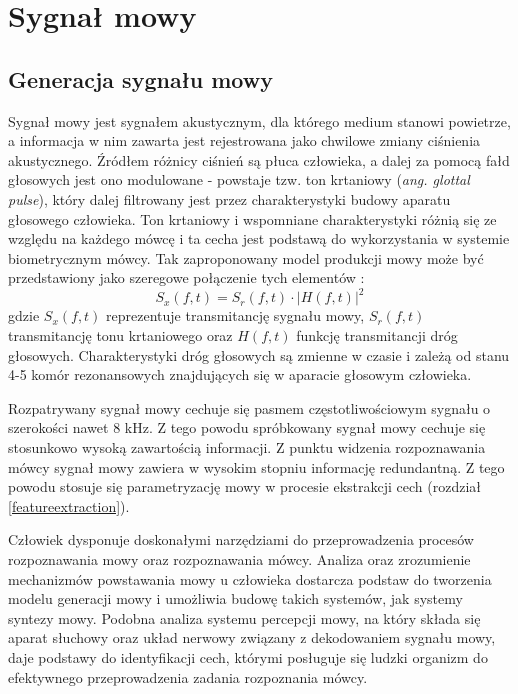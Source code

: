 \section{Sygnał mowy}

\subsection{Generacja sygnału mowy}
\label{glottal}
Sygnał mowy jest sygnałem akustycznym, dla którego medium stanowi powietrze, a informacja w nim zawarta jest rejestrowana jako chwilowe zmiany ciśnienia akustycznego. Źródłem różnicy ciśnień są płuca człowieka, a dalej za pomocą fałd głosowych jest ono modulowane - powstaje tzw. ton krtaniowy (\textit{ang. glottal pulse}), który dalej filtrowany jest przez charakterystyki budowy aparatu głosowego człowieka. Ton krtaniowy i wspomniane charakterystyki różnią się ze względu na każdego mówcę i ta
cecha jest podstawą do wykorzystania w systemie biometrycznym mówcy. Tak zaproponowany model produkcji mowy może być przedstawiony jako szeregowe połączenie tych elementów \cite{multidsp}:
\begin{equation}
  S_x(f,t) = S_r(f,t) \cdot |H(f,t)|^2
\end{equation}
gdzie $S_x(f,t)$ reprezentuje transmitancję sygnału mowy, $S_r(f,t)$ transmitancję tonu krtaniowego oraz $H(f,t)$ funkcję transmitancji dróg głosowych. Charakterystyki dróg głosowych są zmienne w czasie i zależą od stanu 4-5 komór rezonansowych znajdujących się w aparacie głosowym człowieka.

Rozpatrywany sygnał mowy cechuje się pasmem częstotliwościowym sygnału o szerokości nawet 8 kHz. Z tego powodu spróbkowany sygnał mowy cechuje się stosunkowo wysoką zawartością informacji. Z punktu widzenia rozpoznawania mówcy sygnał mowy zawiera w wysokim stopniu informację redundantną. Z tego powodu stosuje się parametryzację mowy w procesie ekstrakcji cech (rozdział \ref{featureextraction}).

Człowiek dysponuje doskonałymi narzędziami do przeprowadzenia procesów rozpoznawania mowy oraz rozpoznawania mówcy. Analiza oraz zrozumienie mechanizmów powstawania mowy u człowieka dostarcza podstaw do tworzenia modelu generacji mowy i umożliwia budowę takich systemów, jak systemy syntezy mowy. Podobna analiza systemu percepcji mowy, na który składa się aparat słuchowy oraz układ nerwowy związany z dekodowaniem sygnału mowy, daje podstawy do identyfikacji cech, którymi posługuje się ludzki organizm do efektywnego przeprowadzenia zadania rozpoznania mówcy.

